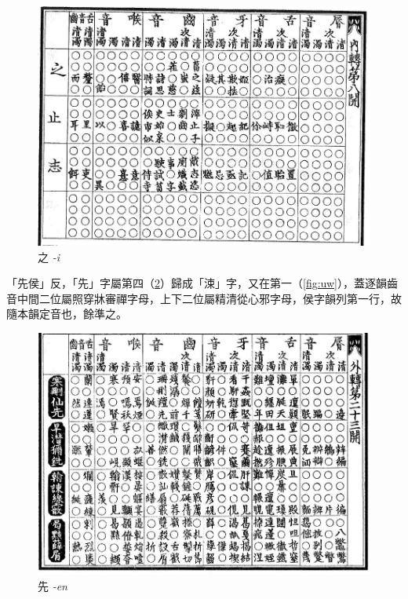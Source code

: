 \documentclass[oneside,a4paper,11pt]{article}
\newcommand{\ipa}[1]{{\phon\textit{#1}}}
\newcommand{\zh}[1]{{\cn #1}}
\newcommand{\zhc}[2]{\zh{#1} \ipa{#2}}
\begin{document}
{\begin{figure}[H]
\centering
\label{fig:i}
\caption{\zhc{之}{-i}}
\includegraphics[width=.9\textwidth]{yunjing-i.jpg}
\end{figure}

「先侯」反，「先」字屬第四（\ref{fig:en}）歸成「涑」字，又在第一（\ref{fig:uw}），蓋逐韻齒音中間二位屬照穿牀審禪字母，上下二位屬精清從心邪字母，侯字韻列第一行，故隨本韻定音也，餘準之。

\begin{figure}[H]
\centering
\label{fig:en}
\caption{\zhc{先}{-en}}
\includegraphics[width=.9\textwidth]{yunjing-an.jpg}
\end{figure}

}
\end{document}
